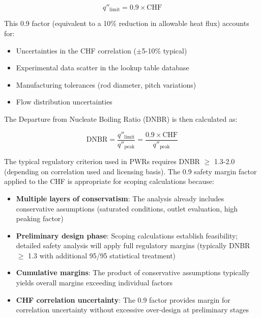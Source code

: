 \begin{equation}
q''_{\text{limit}} = 0.9 \times \text{CHF}
\end{equation}

This 0.9 factor (equivalent to a 10\% reduction in allowable heat flux) accounts for:
\begin{itemize}
    \item Uncertainties in the CHF correlation ($\pm$5-10\% typical)
    \item Experimental data scatter in the lookup table database
    \item Manufacturing tolerances (rod diameter, pitch variations)
    \item Flow distribution uncertainties
\end{itemize}

The Departure from Nucleate Boiling Ratio (DNBR) is then calculated as:

\begin{equation}
\text{DNBR} = \frac{q''_{\text{limit}}}{q''_{\text{peak}}} = \frac{0.9 \times \text{CHF}}{q''_{\text{peak}}}
\end{equation}

The typical regulatory criterion used in PWRs requires DNBR $\geq$ 1.3-2.0 (depending on correlation used and licensing basis). The 0.9 safety margin factor applied to the CHF is appropriate for scoping calculations because:

\begin{itemize}
    \item \textbf{Multiple layers of conservatism}: The analysis already includes conservative assumptions (saturated conditions, outlet evaluation, high peaking factor)
    
    \item \textbf{Preliminary design phase}: Scoping calculations establish feasibility; detailed safety analysis will apply full regulatory margins (typically DNBR $\geq$ 1.3 with additional 95/95 statistical treatment)
    
    \item \textbf{Cumulative margins}: The product of conservative assumptions typically yields overall margins exceeding individual factors
    
    \item \textbf{CHF correlation uncertainty}: The 0.9 factor provides margin for correlation uncertainty without excessive over-design at preliminary stages
\end{itemize}

